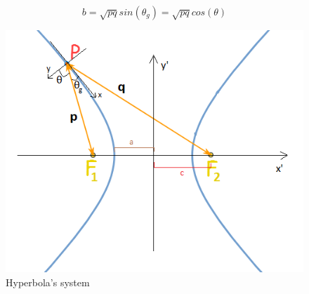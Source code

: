 \begin{equation}
b = \sqrt{p q} sin (\theta_g) = \sqrt{p q} cos (\theta)
\end{equation}
\begin{figure}[H]
%
\centering
%
\includegraphics[width=.8\textwidth]{Immagini/AppendixB/Hyperbola}
%
\caption{Hyperbola's system}
%
\label{fig: System hyperbola AppendixB}
%
\end{figure}
